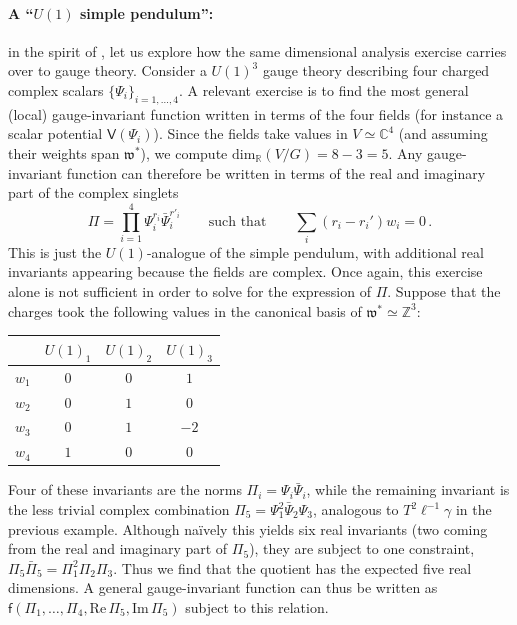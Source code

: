 \documentclass[12pt]{article}
\numberwithin{equation}{section}
\newcommand{\R}{\mathbb{R}}
\newcommand{\Z}{\mathbb{Z}}
\newcommand{\C}{\mathbb{C}}
\renewcommand{\dim}{\mathrm{dim}}
\begin{document}
\paragraph{A ``$U(1)$ simple pendulum'':} in the spirit of , let us explore how the same dimensional analysis exercise carries over to gauge theory. Consider a $U(1)^3$ gauge theory describing four charged complex scalars $\{\Psi_i\}_{i=1,\dots,4}$. A relevant exercise is to find the most general (local) gauge-invariant function written in terms of the four fields (for instance a scalar potential $\mathsf{V}(\Psi_i)$). Since the fields take values in $V\simeq \C^4$ (and assuming their weights span $\mathfrak{w}^*$), we compute ${\dim_\R(V\slash G)=8-3=5}$. Any gauge-invariant function can therefore be written in terms of the real and imaginary part of the complex singlets
\begin{equation}
    \Pi = \prod_{i=1}^4\Psi_i^{r_i}\bar{\Psi}_i^{r'_i} \qquad\text{such that}\qquad \sum_i (r_i-r_i')w_i=0\,.
\end{equation}
This is just the $U(1)$-analogue of the simple pendulum, with additional real invariants appearing because the fields are complex. Once again, this exercise alone is not sufficient in order to solve for the expression of $\Pi$. Suppose that the charges took the following values in the canonical basis of $\mathfrak{w}^*\simeq \Z^3$:
\begin{table}[H]
    \centering
    \begin{tabular}{c*{3}{c}}
         & $U(1)_1$ & $U(1)_2$ & $U(1)_3$\\ \hline
        $w_1$ & $0$ & $0$ & $1$\\
        $w_2$ & $0$ & $1$ & $0$\\
        $w_3$ & $0$ & $1$ & $-2$\\
        $w_4$ & $1$ & $0$ & $0$\\
    \end{tabular}
\end{table}
Four of these invariants are the norms $\Pi_i=\Psi_i\bar{\Psi}_i$, while the remaining invariant is the less trivial complex combination $\Pi_5=\Psi_1^2\bar{\Psi}_2\Psi_3$, analogous to $T^2\ell^{-1}\gamma$ in the previous example. Although na\"ively this yields six real invariants (two coming from the real and imaginary part of $\Pi_5$), they are subject to one constraint, $\Pi_5\bar{\Pi}_5=\Pi_1^2\Pi_2\Pi_3$. Thus we find that the quotient has the expected five real dimensions. A general gauge-invariant function can thus be written as $\mathsf{f}(\Pi_1,\dots,\Pi_4,\mathrm{Re}\,\Pi_5, \mathrm{Im}\,\Pi_5)$ subject to this relation.
\end{document}
